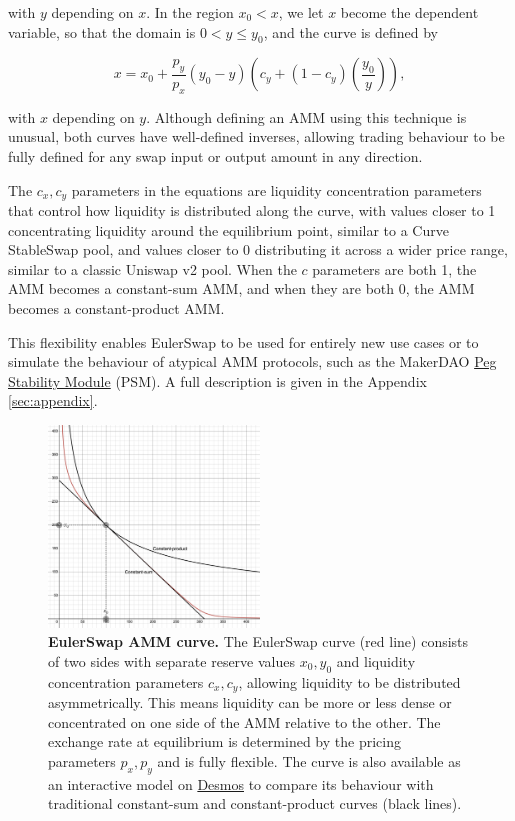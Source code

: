 \documentclass{article}
\begin{document}
with $y$ depending on $x$. In the region $x_0 < x$, we let $x$ become the dependent variable, so that the domain is $0 < y \leq y_0$, and the curve is defined by

\begin{equation}
\label{eq:euler-swap-main-x}
x
=
x_{0}+\frac{p_{y}}{p_{x}}\left(y_{0}-y\right)\left(c_{y}+\left(1-c_{y}\right)\left(\frac{y_{0}}{y}\right)\right),
\end{equation}

with $x$ depending on $y$. Although defining an AMM using this technique is unusual, both curves have well-defined inverses, allowing trading behaviour to be fully defined for any swap input or output amount in any direction.

The $c_x, c_y$ parameters in the equations are liquidity concentration parameters that control how liquidity is distributed along the curve, with values closer to 1 concentrating liquidity around the equilibrium point, similar to a Curve StableSwap pool, and values closer to 0 distributing it across a wider price range, similar to a classic Uniswap v2 pool. When the $c$ parameters are both 1, the AMM becomes a constant-sum AMM, and when they are both 0, the AMM becomes a constant-product AMM.

This flexibility enables EulerSwap to be used for entirely new use cases or to simulate the behaviour of atypical AMM protocols, such as the MakerDAO \href{https://mips.makerdao.com/mips/details/MIP29}{Peg Stability Module} (PSM). A full description is given in the Appendix \ref{sec:appendix}.

\begin{figure}[h]
\centering
\includegraphics[width=0.5\textwidth]{curve.png}
\caption{\textbf{EulerSwap AMM curve.} The EulerSwap curve (red line) consists of two sides with separate reserve values $x_0, y_0$ and liquidity concentration parameters $c_x, c_y$, allowing liquidity to be distributed asymmetrically. This means liquidity can be more or less dense or concentrated on one side of the AMM relative to the other. The exchange rate at equilibrium is determined by the pricing parameters $p_x, p_y$ and is fully flexible. The curve is also available as an interactive model on \href{https://www.desmos.com/calculator/iczoxr4mhw}{Desmos} to compare its behaviour with traditional constant-sum and constant-product curves (black lines).}
\label{fig:fig1}
\end{figure}
\end{document}
